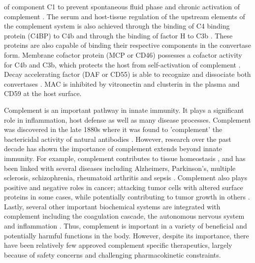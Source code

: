 \documentclass[12pt]{article}
\begin{document}
of component C1 to prevent spontaneous fluid phase and chronic activation of complement \cite{walker1995complement}. The serum and host-tissue regulation of the upstream elements of the complement system is also achieved through the binding of C4 binding protein (C4BP) to C4b and through the binding of factor H to C3b \cite{blom2001structural}. These proteins are also capable of binding their respective components in the convertase form. Membrane cofactor protein (MCP or CD46) possesses a cofactor activity for C4b and C3b, which protects the host from self-activation of complement \cite{riley2004cd46}.  Decay accelerating factor (DAF or CD55) is able to recognize and dissociate both convertases \cite{lukacik2004complement}. MAC is inhibited by vitronectin and clusterin in the plasma and CD59 at the host surface.

Complement is an important pathway in innate immunity. It plays a significant role in inflammation, host defense as well as many disease processes.
Complement was discovered in the late 1880s where it was found to 'complement' the bactericidal activity of natural antibodies \cite{OG_COMPLEMENT_REF}.
However, research over the past decade has shown the importance of complement extends beyond innate immunity.
For example, complement contributes to tissue homeostasis \cite{ricklin2010complement}, and has been linked with several diseases including Alzheimers, Parkinson's, multiple sclerosis, schizophrenia, rheumatoid arthritis and sepsis \cite{ricklin2007complement, rittirsch2008harmful}.
Complement also plays positive and negative roles in cancer; attacking tumor cells with altered surface proteins in some cases, while potentially contributing to tumor growth in others \cite{sarma2011complement, ricklin2013complement}.
Lastly, several other important biochemical systems are integrated with complement including the coagulation cascade, the autonomous nervous system and inflammation \cite{ricklin2013complement}.
Thus, complement is important in a variety of beneficial and potentially harmful functions in the body.
However, despite its importance, there have been relatively few approved complement specific therapeutics, largely because of safety concerns and challenging pharmacokinetic constraints.
\end{document}
